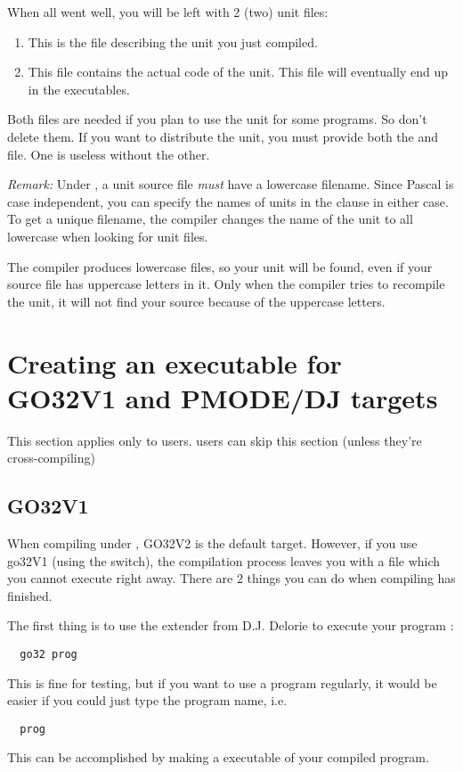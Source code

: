 \documentclass{report}
\begin{document}
When all went well, you will be left with 2 (two) unit files:
\begin{enumerate}
\item {} This is the file describing the unit you just
compiled.
\item {} This file contains the actual code of the unit.
This file will eventually end up in the executables.
\end{enumerate}
Both files are needed if you plan to use the unit for some programs. 
So don't delete them. If you want to distribute the unit, you must
provide both the  and  file. One is useless without the
other.

{\em Remark:}
Under \linux, a unit source file {\em must} have a lowercase filename.
Since Pascal is case independent, you can specify the names of units in the
 clause in either case. To get a unique filename, the \fpc compiler
changes the name of the unit to all lowercase when looking for unit files.

The compiler produces lowercase files, so your unit will be found, even if
your source file has uppercase letters in it. Only when the compiler tries to
recompile the unit, it will not find your source because of the uppercase
letters. 

\section{Creating an executable for GO32V1 and PMODE/DJ targets}

This section applies only to \dos users. \linux users can skip this
section (unless they're cross-compiling)

%
%
\subsection{GO32V1}
When compiling under \dos, GO32V2 is the default target. However, if you use
go32V1 (using the  switch), the 
compilation process leaves you with a file which you cannot execute right away.
There are 2 things you can do when compiling has finished.

The first thing is to use the \dos extender from D.J. Delorie to execute
your program :
\begin{verbatim}
  go32 prog
\end{verbatim}
This is fine for testing, but if you want to use a program regularly, it
would be easier if you could just type the program name, i.e.
\begin{verbatim}
  prog
\end{verbatim}
This can be accomplished by making a \dos executable of your compiled program.
 
\end{document}
